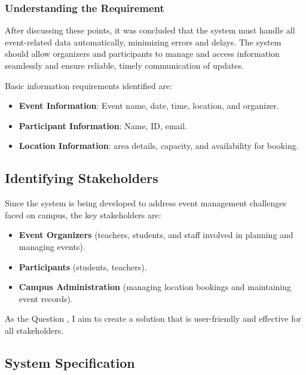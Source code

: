 \subsubsection{Understanding the Requirement}

After discussing these points, it was concluded that the system must handle all event-related data automatically, minimizing errors and delays. The system should allow organizers and participants to manage and access information seamlessly and ensure reliable, timely communication of updates.

Basic information requirements identified are:
\begin{itemize}
    \item \textbf{Event Information}: Event name, date, time, location, and organizer.
    \item \textbf{Participant Information}: Name, ID, email.
    \item \textbf{Location Information}: area details, capacity, and availability for booking.
\end{itemize}

\subsection{Identifying Stakeholders}

Since the system is being developed to address event management challenges faced on campus, the key stakeholders are:

\begin{itemize}
    \item \textbf{Event Organizers} (teachers, students, and staff involved in planning and managing events).
    \item \textbf{Participants} (students, teachers).
    \item \textbf{Campus Administration} (managing location bookings and maintaining event records).
\end{itemize}

As the Question , I aim to create a solution that is user-friendly and effective for all stakeholders.

\subsection{System Specification}

